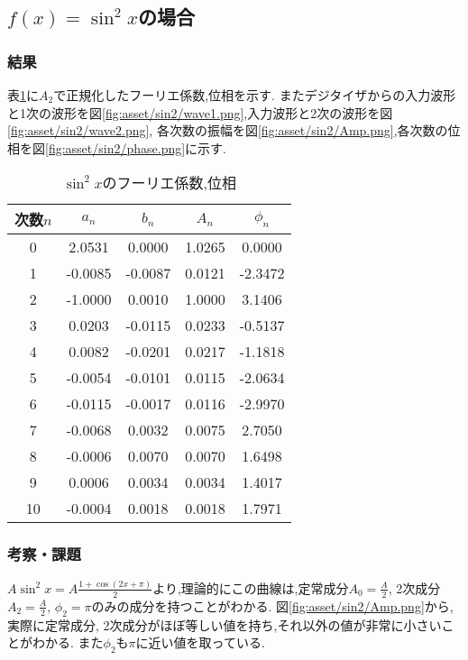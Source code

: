 \subsection{$f(x)=\sin^2x$の場合}
\subsubsection{結果}
表\ref{tab:sin2_res}に$A_2$で正規化したフーリエ係数,位相を示す.
またデジタイザからの入力波形と1次の波形を図\ref{fig:asset/sin2/wave1.png},入力波形と2次の波形を図\ref{fig:asset/sin2/wave2.png},
各次数の振幅を図\ref{fig:asset/sin2/Amp.png},各次数の位相を図\ref{fig:asset/sin2/phase.png}に示す.
\begin{table}[h]
   \caption{$\sin^2x$のフーリエ係数,位相}
   \label{tab:sin2_res}
   \centering
   \begin{tabular}{ccccc}
     \hline
     次数$n$&$a_n$&$b_n$&$A_n$&$\phi_n$\\
     \hline \hline
     0 & 2.0531 & 0.0000 & 1.0265 & 0.0000 \\
1 & -0.0085 & -0.0087 & 0.0121 & -2.3472 \\
2 & -1.0000 & 0.0010 & 1.0000 & 3.1406 \\
3 & 0.0203 & -0.0115 & 0.0233 & -0.5137 \\
4 & 0.0082 & -0.0201 & 0.0217 & -1.1818 \\
5 & -0.0054 & -0.0101 & 0.0115 & -2.0634 \\
6 & -0.0115 & -0.0017 & 0.0116 & -2.9970 \\
7 & -0.0068 & 0.0032 & 0.0075 & 2.7050 \\
8 & -0.0006 & 0.0070 & 0.0070 & 1.6498 \\
9 & 0.0006 & 0.0034 & 0.0034 & 1.4017 \\
10 & -0.0004 & 0.0018 & 0.0018 & 1.7971 \\
     \hline
   \end{tabular}
\end{table}
\begin{figure}[htbp]
  \begin{minipage}{0.5\hsize}
  \end{minipage}
  \begin{minipage}{0.5\hsize}
  \end{minipage} 
\end{figure}
\begin{figure}[htbp]
  \begin{minipage}{0.5\hsize}
  \end{minipage}
  \begin{minipage}{0.5\hsize}
  \end{minipage} 
\end{figure}
\newpage
\subsubsection{考察・課題}
$A\sin^2 x=A\frac{1+\cos (2x+\pi)}{2}$より,理論的にこの曲線は,定常成分$A_0=\frac{A}{2}$, 2次成分$A_2=\frac{A}{2}$, $\phi_2=\pi$のみの成分を持つことがわかる.
図\ref{fig:asset/sin2/Amp.png}から,実際に定常成分, 2次成分がほぼ等しい値を持ち,それ以外の値が非常に小さいことがわかる.
また$\phi_2$も$\pi$に近い値を取っている.